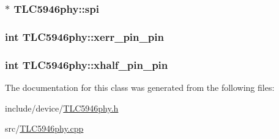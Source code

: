 \hypertarget{class_t_l_c5946phy_aa1cd89ab21c1ce96acc6d2cc8af4136e}{
\subsubsection[{spi}]{$\ast$ T\-L\-C5946phy\-::spi\hspace{0.3cm}{\ttfamily [protected]}}}\label{class_t_l_c5946phy_aa1cd89ab21c1ce96acc6d2cc8af4136e}
\hypertarget{class_t_l_c5946phy_a4c79de11b56731d25e7f0f0455b960f0}{
\subsubsection[{xerr\-\_\-pin\-\_\-pin}]{\setlength{\rightskip}{0pt plus 5cm}int T\-L\-C5946phy\-::xerr\-\_\-pin\-\_\-pin\hspace{0.3cm}{\ttfamily [protected]}}}\label{class_t_l_c5946phy_a4c79de11b56731d25e7f0f0455b960f0}
\hypertarget{class_t_l_c5946phy_a072b879adb9d018b4a9905b53cb497f0}{
\subsubsection[{xhalf\-\_\-pin\-\_\-pin}]{\setlength{\rightskip}{0pt plus 5cm}int T\-L\-C5946phy\-::xhalf\-\_\-pin\-\_\-pin\hspace{0.3cm}{\ttfamily [protected]}}}\label{class_t_l_c5946phy_a072b879adb9d018b4a9905b53cb497f0}


The documentation for this class was generated from the following files\-:\begin{DoxyCompactItemize}
\item 
include/device/\hyperlink{_t_l_c5946phy_8h}{T\-L\-C5946phy.\-h}\item 
src/\hyperlink{_t_l_c5946phy_8cpp}{T\-L\-C5946phy.\-cpp}\end{DoxyCompactItemize}
